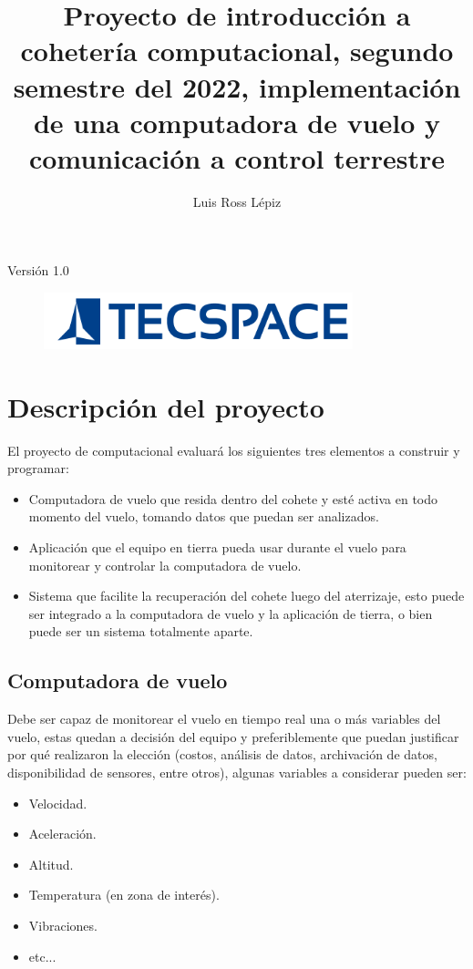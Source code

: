 ﻿\documentclass[letterpaper]{article}
\title{Proyecto de introducción a cohetería computacional, segundo semestre del 2022, implementación
de una computadora de vuelo y comunicación a control terrestre}
\author{Luis Ross Lépiz}
\begin{document}
\maketitle
\thispagestyle{empty}
\begin{center}
    Versión 1.0
\end{center}

\begin{figure}[b]
    \centering
    \includegraphics[width=0.8\textwidth]{img/logo.png}
\end{figure}
\clearpage

\tableofcontents
\clearpage

\section{Descripción del proyecto}
El proyecto de computacional evaluará los siguientes tres elementos a construir y programar:
\begin{itemize}
    \item Computadora de vuelo que resida dentro del cohete y esté activa en todo momento del vuelo, 
        tomando datos que puedan ser analizados.
    \item Aplicación que el equipo en tierra pueda usar durante el vuelo para monitorear y controlar la computadora de vuelo.
    \item Sistema que facilite la recuperación del cohete luego del aterrizaje, esto puede ser 
        integrado a la computadora de vuelo y la aplicación de tierra, o bien puede ser un sistema totalmente aparte.
\end{itemize}

\subsection{Computadora de vuelo}
Debe ser capaz de monitorear el vuelo en tiempo real una o más variables del vuelo, estas quedan a 
decisión del equipo y preferiblemente que puedan justificar por qué realizaron la elección (costos, 
análisis de datos, archivación de datos, disponibilidad de sensores, entre otros), algunas variables 
a considerar pueden ser:
\begin{itemize}
    \item Velocidad.
    \item Aceleración.
    \item Altitud.
    \item Temperatura (en zona de interés).
    \item Vibraciones.
    \item etc...
\end{itemize}
\end{document}
